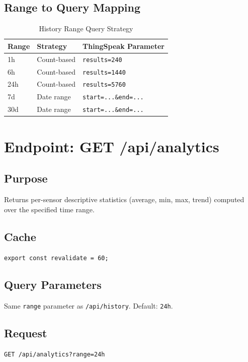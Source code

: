 \subsection{Range to Query Mapping}
\begin{table}[H]
\centering
\caption{History Range Query Strategy}
\begin{tabular}{|l|l|l|}
\hline
\rowcolor{FloodLight}
\textbf{Range} & \textbf{Strategy} & \textbf{ThingSpeak Parameter} \\
\hline
1h & Count-based & \texttt{results=240} \\
6h & Count-based & \texttt{results=1440} \\
24h & Count-based & \texttt{results=5760} \\
7d & Date range & \texttt{start=.\allowbreak{}.\allowbreak{}.\allowbreak{}\&end=.\allowbreak{}.\allowbreak{}.\allowbreak{}} \\
30d & Date range & \texttt{start=.\allowbreak{}.\allowbreak{}.\allowbreak{}\&end=.\allowbreak{}.\allowbreak{}.\allowbreak{}} \\
\hline
\end{tabular}
\end{table}

\section{Endpoint: GET /api/analytics}

\subsection{Purpose}
Returns per-sensor descriptive statistics (average, min, max, trend) computed over the specified time range.

\subsection{Cache}
\texttt{export const revalidate = 60;}

\subsection{Query Parameters}
Same \texttt{range} parameter as \texttt{/\allowbreak{}api/\allowbreak{}history}. Default: \texttt{24h}.

\subsection{Request}
\begin{lstlisting}[language={},caption={GET /api/analytics request}]
GET /api/analytics?range=24h
\end{lstlisting}

